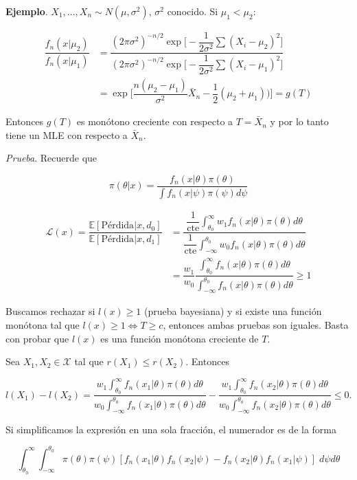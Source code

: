 \documentclass[
  12pt,
]{book}
\begin{document}
\textbf{Ejemplo}. \(X_1,\dots, X_n \sim N(\mu,\sigma^2)\), \(\sigma^2\) conocido.
Si \(\mu_1<\mu_2\):

\begin{align*}
\dfrac{f_n(x|\mu_2)}{f_n(x|\mu_1)} & = \dfrac{(2\pi\sigma^2)^{-n/2}\exp\bigg[-\dfrac 1{2\sigma^2}\sum (X_i-\mu_2)^2\bigg]}{(2\pi\sigma^2)^{-n/2}\exp\bigg[-\dfrac 1{2\sigma^2}\sum (X_i-\mu_1)^2\bigg]}\\
& = \exp\bigg[\dfrac{n(\mu_2-\mu_1)}{\sigma^2}\bar X_n -\dfrac 12 (\mu_2+\mu_1))\bigg] = g(T)
\end{align*}

Entonces \(g(T)\) es monótono creciente con respecto a \(T=\bar X_n\) y por lo tanto tiene un MLE con respecto a \(\bar X_n\).

\emph{Prueba}. Recuerde que

\[\pi(\theta|x) = \dfrac{f_n(x|\theta)\pi(\theta)}{\int f_n(x|\psi)\pi(\psi)d\psi}\]

\begin{align*}
\mathcal L(x) = \dfrac{\mathbb E[\text{Pérdida}|x,d_0]}{\mathbb E[\text{Pérdida}|x,d_1]} & = \dfrac{\dfrac 1{\text{cte}} \displaystyle\int_{\theta_0}^\infty w_1f_n(x|\theta)\pi(\theta)d\theta}{\dfrac 1{\text{cte}} \displaystyle\int_{-\infty}^{\theta_0} w_0f_n(x|\theta)\pi(\theta)d\theta} \\ & = \dfrac{w_1}{w_0}\dfrac{ \displaystyle\int_{\theta_0}^\infty f_n(x|\theta)\pi(\theta)d\theta}{ \displaystyle\int_{-\infty}^{\theta_0} f_n(x|\theta)\pi(\theta)d\theta}  \geq 1
\end{align*}

Buscamos rechazar si \(l(x)\geq 1\) (prueba bayesiana) y si existe una función monótona tal que \(l(x)\geq 1 \Leftrightarrow T\geq c\), entonces ambas pruebas son iguales. Basta con probar que \(l(x)\) es una función monótona creciente de \(T\).

Sea \(X_1,X_2\in \mathcal X\) tal que \(r(X_1)\leq r(X_2)\). Entonces

\[l(X_1)-l(X_2) =\dfrac{w_1 \displaystyle\int_{\theta_0}^\infty f_n(x_1|\theta)\pi(\theta)d\theta}{w_0 \displaystyle\int_{-\infty}^{\theta_0} f_n(x_1|\theta)\pi(\theta)d\theta} -\dfrac{w_1 \displaystyle\int_{\theta_0}^\infty f_n(x_2|\theta)\pi(\theta)d\theta}{w_0 \displaystyle\int_{-\infty}^{\theta_0} f_n(x_2|\theta)\pi(\theta)d\theta}\leq 0. \]

Si simplificamos la expresión en una sola fracción, el numerador es de la forma

\[\int_{\theta_0}^\infty\int_{-\infty}^{\theta_0}\pi(\theta)\pi(\psi)[f_n(x_1|\theta)f_n(x_2|\psi)-f_n(x_2|\theta)f_n(x_1|\psi)]\;d\psi d\theta\]
\end{document}
